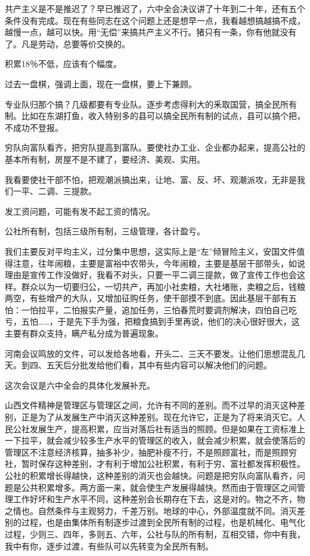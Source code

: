 共产主义是不是推迟了？早已推迟了，六中全会决议讲了十年到二十年，还有五个条件没有完成。现在有些同志在这个问题上还是想早一点，我看越想搞越搞不成，越慢一点，越可以快。用“无偿”来搞共产主义不行。猪只有一条，你有他就没有了。凡是劳动，总要等价交换的。

积累18％不低，应该有个幅度。

过去一盘棋，强调上面，现在一盘棋，要上下兼顾。

专业队归那个搞？几级都要有专业队。逐步考虑得利大的釆取国营，搞全民所有制。比如在东湖打鱼，收入特别多的县可以搞全民所有制的试点，县可以搞个把，不成功不登报。

穷队向富队看齐，把穷队提高到富队。要使社办工业、企业都办起来，提高公社的基本所有制，房屋不是不建了，要经济、美观、实用。

我看要使社干部不怕，把观潮派搞出来，让地、富、反、坏、观潮派攻，无非是我们一平、二调、三提款。

发工资问题，可能有发不起工资的情况。

公社所有制，包括三级所有制，三级管理，各计盈亏。

我们主要反对平均主义，过分集中思想，这实际上是“左”倾冒险主义，安国文件值得注意，往年闹粮，主要是富裕中农带头，今年闹粮，主要是基层干部带头，如说理由是宣传工作没做好，我看不对头，只要一平二调三提款，做了宣传工作也会这样。群众以为一切要归公，一切共产，再加小社卖粮，大社堵账，卖粮之后，钱粮两空，有些增产的大队，又增加征购任务，使干部摸不到底。因此基层干部有五怕：一怕拉平，二怕报实产量，追加任务，三怕春荒时要调剂解决，四怕自己吃亏，五怕……，于是先下手为强，把粮食搞到手里再说，他们的决心很好很大，这主要有群众支持，瞒产私分成为普遍现象。

河南会议鸣放的文件，可以发给各地看，开头二、三天不要发。让他们思想混乱几天。到四、五天后分批发给他们看，其中有些内容可以解决他们的问题。

这次会议是六中全会的具体化发展补充。

山西文件精神是管理区与管理区之间，允许有不同的差别。而不过早的消灭这种差别，正是为了从发展生产中消灭这种差别。现在允许它，正是为了将来消灭它。人民公社发展生产，提高积累，应当对落后社有适当的照顾。但是如果在工资标准上一下拉平，就会减少较多生产水平的管理区的收入，就会减少积累，就会使落后的管理区不注意经济核算，抽多补少，抽肥补瘦不行，不是照顾富社，而是照顾穷社，暂时保存这种差别，才有利于增加公社积累，有利于穷、富社都发挥积极性。公社的积累增长得越快，这种差别的消灭也会越快。问题是把穷队向富队看齐，问题是公共积累增多。两方面一来，就会使生产发展得越快。然而由于管理区之间管理工作好坏和生产水平不同，这种差别会长期存在下去，这是对的。物之不齐，物之情也。自然条件与主观努力，千差万别。地球的中心，外部温度就不同。消灭差别的过程，也是由集体所有制逐步过渡到全民所有制的过程，也是机械化、电气化过程，少则三、四年，多则五、六年，公社与队的所有制，互相交错，你中有我，我中有你，逐步过渡，有些队可以先转变为全民所有制。

